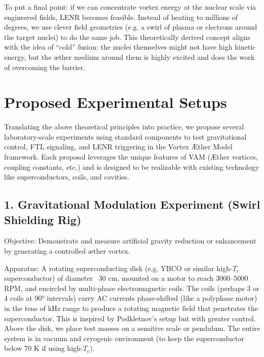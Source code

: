 To put a final point: if we can concentrate vortex energy at the nuclear scale via engineered fields, LENR becomes feasible. Instead of heating to millions of degrees, we use clever field geometries (e.g. a swirl of plasma or electrons around the target nuclei) to do the same job. This theoretically derived concept aligns with the idea of “cold” fusion: the nuclei themselves might not have high kinetic energy, but the æther medium around them is highly excited and does the work of overcoming the barrier.


\section*{Proposed Experimental Setups}

Translating the above theoretical principles into practice, we propose several laboratory-scale experiments using standard components to test gravitational control, FTL signaling, and LENR triggering in the Vortex Æther Model framework. Each proposal leverages the unique features of VAM (Æther vortices, coupling constants, etc.) and is designed to be realizable with existing technology like superconductors, coils, and cavities.


\subsection*{1. Gravitational Modulation Experiment (Swirl Shielding Rig)}

Objective: Demonstrate and measure artificial gravity reduction or enhancement by generating a controlled æther vortex.


Apparatus: A rotating superconducting disk (e.g. YBCO or similar high-$T_c$ superconductor) of diameter ~30 cm, mounted on a motor to reach 3000–5000 RPM, and encircled by multi-phase electromagnetic coils. The coils (perhaps 3 or 4 coils at 90° intervals) carry AC currents phase-shifted (like a polyphase motor) in the tens of kHz range to produce a rotating magnetic field that penetrates the superconductor. This is inspired by Podkletnov’s setup but with greater control. Above the disk, we place test masses on a sensitive scale or pendulum. The entire system is in vacuum and cryogenic environment (to keep the superconductor below 70 K if using high-$T_c$).



